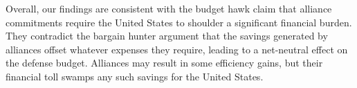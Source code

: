 
Overall, our findings are consistent with the budget hawk claim that alliance commitments require the United States to shoulder a significant financial burden. They contradict the bargain hunter argument that the savings generated by alliances offset whatever expenses they require, leading to a net-neutral effect on the defense budget. Alliances may result in some efficiency gains, but their financial toll swamps any such savings for the United States. 


